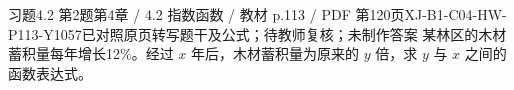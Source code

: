 \par\noindent\begin{minipage}{\linewidth}
\begin{bankitem}{习题4.2 第2题}{第4章 / 4.2 指数函数 / 教材 p.113 / PDF 第120页}{XJ-B1-C04-HW-P113-Y1057}{已对照原页转写题干及公式；待教师复核；未制作答案}
某林区的木材蓄积量每年增长12\%。经过 $x$ 年后，木材蓄积量为原来的 $y$ 倍，求 $y$ 与 $x$ 之间的函数表达式。
\end{bankitem}
\end{minipage}\par\medskip
